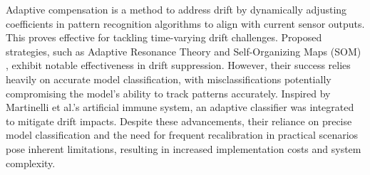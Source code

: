 \documentclass[a4paper]{cas-sc}
\begin{document}
Adaptive compensation is a method to address drift by dynamically adjusting coefficients in pattern recognition algorithms to align with current sensor outputs. This proves effective for tackling time-varying drift challenges. Proposed strategies, such as Adaptive Resonance Theory \citep{DISTANTE2000248} and Self-Organizing Maps (SOM) \citep{zuppa2004drift}, exhibit notable effectiveness in drift suppression. However, their success relies heavily on accurate model classification, with misclassifications potentially compromising the model's ability to track patterns accurately. 
Inspired by Martinelli et al.'s \citep{MARTINELLI20131017} artificial immune system, an adaptive classifier was integrated to mitigate drift impacts. Despite these advancements, their reliance on precise model classification and the need for frequent recalibration in practical scenarios pose inherent limitations, resulting in increased implementation costs and system complexity. 

\end{document}
